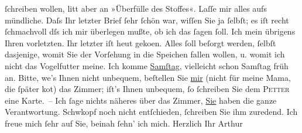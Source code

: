 \begin{ledgroupsized}[t]{13cm}
               ſchreiben wollen, litt aber an »Überfülle des Stoffes«. Laſſe mir alles aufs
               mündliche. Daſs Ihr letzter Brief ſehr ſchön {\pb}war, wiſſen Sie ja ſelbſt; es iſt recht ſchmachvoll dſs ich mir überlegen mußte, ob
               ich das ſagen ſoll. Ich mein übrigens Ihren vorletzten. Ihr letzter iſt heut geko{\geminationm}en.\pend
           \pstart
           Alles ſoll beſorgt werden, ſelbſt dasjenige, womit Sie der Vorſehung in die Speichen
               fallen wollen, u. womit ich nicht das Vogel{\pb}futter meine.\pend
           \pstart
           Ich komme \uline{Samſtag}, vielleicht schon Samſtag früh an.
               Bitte, we{\geminationn}’s Ihnen nicht unbequem, beſtellen Sie \uline{mir} (nicht für meine Mama, die ſpäter ko{\geminationm}t) das
               Zimmer; iſt’s Ihnen unbequem, ſo ſchreiben Sie dem \textsc{Petter} eine {\pb}Karte. – Ich ſage nichts näheres
               über das Zimmer, \uline{Sie} haben die ganze
               Verantwortung.\pend
           \pstart
           Schwkopf noch nicht entſchieden, ſchreiben Sie
               ihm zuredend.\pend
           \pstart
           Ich freue mich ſehr auf Sie, beinah ſehn’ ich mich.\pend
           \pstart Herzlich Ihr \spacefill\mbox{Arthur}\pend{}\endnumbering{}\end{ledgroupsized}  \newcommand{\dateiname}{L00690}\newcommand{\titel}{Arthur Schnitzler an Richard Beer-Hofmann, 23. 6. 1897}\newcommand{\editorInnen}{Martin Anton Müller und Gerd-Hermann Susen}
      